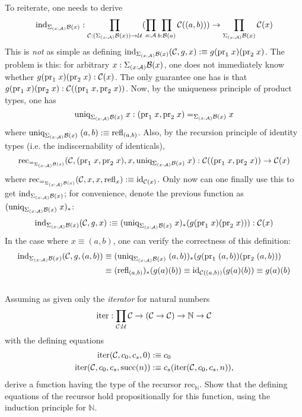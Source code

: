 To reiterate, one needs to derive
\[
	\text{ind}_{\Sigma_{(x : \mathcal{A})}\mathcal{B}(x)} : \prod_{\mathcal{C} : (\Sigma_{(x : \mathcal{A})}\mathcal{B}(x)) \to \mathcal{U}}(\prod_{a : \mathcal{A}}\prod_{b : \mathcal{B}(a)}\mathcal{C}((a,b))) \to \prod_{\Sigma_{(x : \mathcal{A})}\mathcal{B}(x)}\mathcal{C}(x)
\]
This is \textit{not} as simple as defining $\text{ind}_{\Sigma_{(x : \mathcal{A})}\mathcal{B}(x)}(\mathcal{C},g,x) :\equiv g(\text{pr}_1\;x)(\text{pr}_2\;x)$. The problem is this: for arbitrary $x : \Sigma_{(x : \mathcal{A})}\mathcal{B}(x)$, one does not immediately know whether $g(\text{pr}_1\;x)(\text{pr}_2\;x) : \mathcal{C}(x)$. The only guarantee one has is that $g(\text{pr}_1\;x)(\text{pr}_2\;x) : \mathcal{C}((\text{pr}_1\;x,\text{pr}_2\;x))$. Now, by the uniqueness principle of product types, one has
\[
	\text{uniq}_{\Sigma_{(x : \mathcal{A})}\mathcal{B}(x)}\;x : (\text{pr}_1\;x,\text{pr}_2\;x) =_{\Sigma_{(x : \mathcal{A})}\mathcal{B}(x)} x
\]
where $\text{uniq}_{\Sigma_{(x : \mathcal{A})}\mathcal{B}(x)}\;(a,b) :\equiv \text{refl}_{(a,b)}$. Also, by the recursion principle of identity types (i.e. the indiscernability of identicals),
\[
	\text{rec}_{=_{\Sigma_{(x : \mathcal{A})}\mathcal{B}(x)}}(\mathcal{C}, (\text{pr}_1\;x,\text{pr}_2\;x), x, \text{uniq}_{\Sigma_{(x : \mathcal{A})}\mathcal{B}(x)}\;x) : \mathcal{C}((\text{pr}_1\;x,\text{pr}_2\;x)) \to \mathcal{C}(x)
\]
where $\text{rec}_{=_{\Sigma_{(x : \mathcal{A})}\mathcal{B}(x)}}(\mathcal{C},x,x,\text{refl}_x) :\equiv \text{id}_{\mathcal{C}(x)}$. Only now can one finally use this to get $\text{ind}_{\Sigma_{(x : \mathcal{A})}\mathcal{B}(x)}$; for convenience, denote the previous function as $(\text{uniq}_{\Sigma_{(x : \mathcal{A})}\mathcal{B}(x)}\;x)_*$:
\[
\text{ind}_{\Sigma_{(x : \mathcal{A})}\mathcal{B}(x)}(\mathcal{C},g,x) :\equiv (\text{uniq}_{\Sigma_{(x : \mathcal{A})}\mathcal{B}(x)}\;x)_*(g(\text{pr}_1\;x)(\text{pr}_2\;x))) : \mathcal{C}(x)
\]
In the case where $x \equiv (a,b)$, one can verify the correctness of this definition:
\begin{align*}
	\text{ind}_{\Sigma_{(x : \mathcal{A})}\mathcal{B}(x)}(\mathcal{C},g,(a,b)) &\equiv (\text{uniq}_{\Sigma_{(x : \mathcal{A})}\mathcal{B}(x)}\;(a,b))_*(g(\text{pr}_1\;(a,b))(\text{pr}_2\;(a,b)))\\
	&\equiv  (\text{refl}_{(a,b)})_*(g(a)(b)) \equiv  \text{id}_{\mathcal{C}((a,b))}(g(a)(b)) \equiv  g(a)(b)
\end{align*} \\



 Assuming as given only the \textit{iterator} for natural numbers
\[
	\text{iter} : \prod_{\mathcal{C}:\mathcal{U}} \mathcal{C} \to (\mathcal{C} \to \mathcal{C}) \to \mathbb{N} \to \mathcal{C}
\]
with the defining equations
\begin{align*}
	\text{iter}(\mathcal{C}, c_{0}, c_{s}, 0) &:\equiv c_{0} \\
	\text{iter}(\mathcal{C}, c_{0}, c_{s}, \text{succ}(n)) &:\equiv c_{s}(\text{iter}(\mathcal{C}, c_{0}, c_{s}, n)),
\end{align*}
derive a function having the type of the recursor $\text{rec}_{\mathbb{N}}$. Show that the defining equations of the recursor hold propositionally for this function, using the induction principle for $\mathbb{N}$. \\


